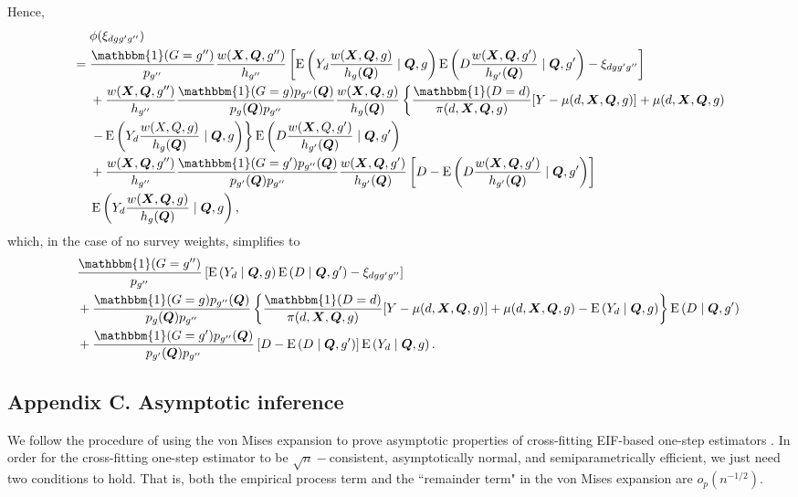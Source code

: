 \documentclass[12pt,a4paper]{article}
\newcommand{\E}{\operatorname{E}}
\def\X{{\boldsymbol X}}
\def\Q{{\boldsymbol Q}}
\def\one{\mathbbm{1}}
\begin{document}
Hence,
\begin{align*}
    &\phantom{{}={}} \phi(\xi_{dgg'g''}) \\
    &= \frac{\one(G=g'')}{p_{g''}}\frac{w(\X,\Q,g'')}{h_{g''}} \left[ \E \left(Y_d \frac{w(\X,\Q,g)}{h_{g}(\Q)}  \mid \Q, g \right) \E \left(D \frac{w(\X,\Q,g')}{h_{g'}(\Q)} \mid \Q, g' \right) - \xi_{dgg'g''} \right] \\
    &\phantom{{}={}} + \frac{w(\X,\Q,g'')}{h_{g''}}  \frac{\one(G=g) p_{g''}(\Q)}{p_g(\Q)p_{g''}} \frac{w(\X,\Q,g)}{h_g(\Q)} \left\{ \frac{\one(D=d)}{\pi(d,\X,\Q,g)} [Y-\mu(d,\X,\Q,g)]+\mu(d,\X,\Q,g) \right. \\
    &\phantom{{}={}} \left. - \E \left(Y_d \frac{w(X,Q,g)}{h_g(\Q)} \mid \Q,g \right) \right\} \E \left(D \frac{w(\X,Q,g')}{h_{g'}(\Q)} \mid \Q,g' \right) \\
    &\phantom{{}={}} + \frac{w(\X,\Q,g'')}{h_{g''}}  \frac{\one(G=g')p_{g''}(\Q)}{p_{g'}(\Q)p_{g''}} \frac{w(\X,\Q,g')}{h_{g'}(\Q)} \left[ D-\E \left(D \frac{w(\X,\Q,g')}{h_{g'}(\Q)} \mid \Q, g' \right) \right] \\
    &\phantom{{}={}} \E\left( Y_d \frac{w(\X,\Q,g)}{h_g(\Q)} \mid \Q, g \right), 
\end{align*}
which, in the case of no survey weights, simplifies to 
\begin{align*}
    &\phantom{{}={}} \frac{\one(G=g'')}{p_{g''}} \left[ \E \left(Y_d \mid \Q, g \right) \E \left(D \mid \Q, g' \right) - \xi_{dgg'g''} \right] \\
    &\phantom{{}={}} + \frac{\one(G=g) p_{g''}(\Q)}{p_g(\Q)p_{g''}} \left\{ \frac{\one(D=d)}{\pi(d,\X,\Q,g)} [Y-\mu(d,\X,\Q,g)]+\mu(d,\X,\Q,g) - \E \left(Y_d \mid \Q,g \right) \right\} \E \left(D \mid \Q,g' \right) \\
    &\phantom{{}={}} + \frac{\one(G=g')p_{g''}(\Q)}{p_{g'}(\Q)p_{g''}} \left[ D-\E \left(D \mid \Q, g' \right) \right] \E\left( Y_d \mid \Q, g \right).
\end{align*}

\begin{comment}
I've double checked the proof in appendix B. AY. 08/24/2022
\end{comment}

\subsection*{Appendix C. Asymptotic inference}

We follow the procedure of using the von Mises expansion to prove asymptotic properties of cross-fitting EIF-based one-step estimators \citep{hines_demystifying_2022, kennedy_semiparametric_2022, fisher_visually_2021}. In order for the cross-fitting one-step estimator to be  $\sqrt{n}-$consistent, asymptotically normal, and semiparametrically efficient, we just need two conditions to hold. That is, both the empirical process term and the ``remainder term" in the von Mises expansion are $o_p(n^{-1/2})$.
\end{document}
